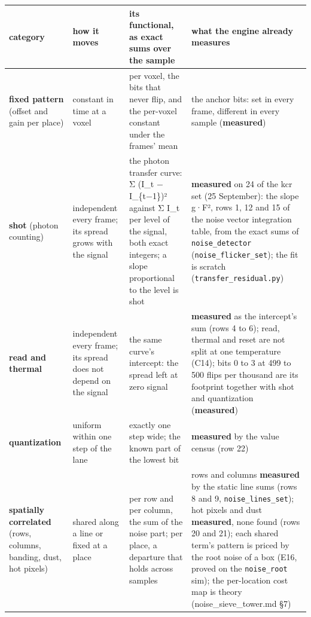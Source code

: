{\footnotesize
\setlength{\tabcolsep}{6pt}
\begin{longtable}{>{\RaggedRight\arraybackslash}p{}>{\RaggedRight\arraybackslash}p{}>{\RaggedRight\arraybackslash}p{}>{\RaggedRight\arraybackslash}p{}}
\toprule
category & how it moves & its functional, as exact sums over the sample & what the engine already measures \\
\midrule
\endhead
\textbf{fixed pattern} (offset and gain per place) & constant in time at a voxel & per voxel, the bits that never flip, and the per-voxel constant under the frames' mean & the anchor bits: set in every frame, different in every sample (\textbf{measured}) \\
\textbf{shot} (photon counting) & independent every frame; its spread grows with the signal & the photon transfer curve: Σ (I\_\allowbreak{}t − I\_\allowbreak{}\{t−1\})² against Σ I\_\allowbreak{}t per level of the signal, both exact integers; a slope proportional to the level is shot & \textbf{measured} on 24 of the kcr set (25 September): the slope g·F², rows 1, 12 and 15 of the noise vector integration table, from the exact sums of \texttt{noise\_\allowbreak{}detector} (\texttt{noise\_\allowbreak{}flicker\_\allowbreak{}set}); the fit is scratch (\texttt{transfer\_\allowbreak{}residual.\allowbreak{}py}) \\
\textbf{read and thermal} & independent every frame; its spread does not depend on the signal & the same curve's intercept: the spread left at zero signal & \textbf{measured} as the intercept's sum (rows 4 to 6); read, thermal and reset are not split at one temperature (C14); bits 0 to 3 at 499 to 500 flips per thousand are its footprint together with shot and quantization (\textbf{measured}) \\
\textbf{quantization} & uniform within one step of the lane & exactly one step wide; the known part of the lowest bit & \textbf{measured} by the value census (row 22) \\
\textbf{spatially correlated} (rows, columns, banding, dust, hot pixels) & shared along a line or fixed at a place & per row and per column, the sum of the noise part; per place, a departure that holds across samples & rows and columns \textbf{measured} by the static line sums (rows 8 and 9, \texttt{noise\_\allowbreak{}lines\_\allowbreak{}set}); hot pixels and dust \textbf{measured}, none found (rows 20 and 21); each shared term's pattern is priced by the root noise of a box (E16, proved on the \texttt{noise\_\allowbreak{}root} sim); the per-location cost map is theory (noise\_\allowbreak{}sieve\_\allowbreak{}tower.md §7) \\
\bottomrule
\end{longtable}
}

